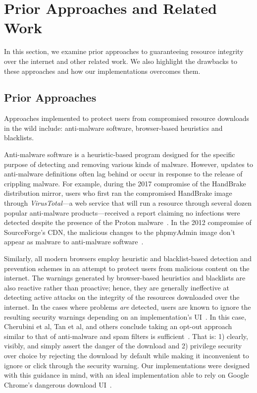 \section{Prior Approaches and Related Work} \label{sec:related}

In this section, we examine prior approaches to guaranteeing resource integrity
over the internet and other related work. We also highlight the drawbacks to
these approaches and how our \SYSTEM{} implementations overcomes them.

\subsection{Prior Approaches}

Approaches implemented to protect users from compromised resource downloads in
the wild include: anti-malware software, browser-based heuristics and
blacklists.

Anti-malware software is a heuristic-based program designed for the specific
purpose of detecting and removing various kinds of malware. However, updates to
anti-malware definitions often lag behind or occur in response to the release of
crippling malware. For example, during the 2017 compromise of the HandBrake
distribution mirror, users who first ran the compromised HandBrake image through
\textit{VirusTotal}---a web service that will run a resource through several
dozen popular anti-malware products---received a report claiming no infections
were detected despite the presence of the Proton malware~\cite{SCA-HB1}. In the
2012 compromise of SourceForge's CDN, the malicious changes to the phpmyAdmin
image don't appear as malware to anti-malware software~\cite{SCA-PMA1}.

Similarly, all modern browsers employ heuristic and blacklist-based detection
and prevention schemes in an attempt to protect users from malicious content on
the internet. The warnings generated by browser-based heuristics and blacklists
are also reactive rather than proactive; hence, they are generally ineffective
at detecting active attacks on the integrity of the resources downloaded over
the internet. In the cases where problems \emph{are} detected, users are known
to ignore the resulting security warnings depending on an implementation's
UI~\cite{Clickthrough, Modic, Akhawe, ChromeClickThrough}. In this case,
Cherubini et al, Tan et al, and others conclude taking an opt-out approach
similar to that of anti-malware and spam filters is sufficient~\cite{Cherubini,
Tan}. That is: 1) clearly, visibly, and simply assert the danger of the download
and 2) privilege security over choice by rejecting the download by default while
making it inconvenient to ignore or click through the security warning. Our
\SYSTEM{} implementations were designed with this guidance in mind, with an
ideal implementation able to rely on Google Chrome's dangerous download
UI~\cite{ChromeClickThrough}.

